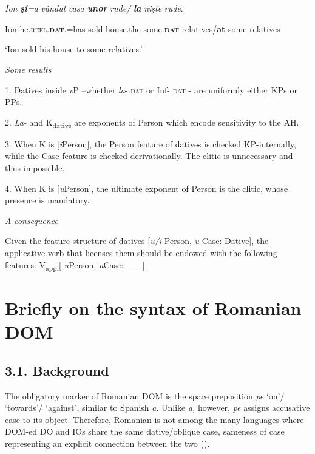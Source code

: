 \documentclass[output=paper,modfonts,nonflat]{langsci/langscibook}
\begin{document}
\ea%
    \label{ex:key:21}
    \gll\\
        \\
    \glt
    \z

          \textit{Ion}  \textbf{\textit{şi}}\textit{=a}  \textit{vândut}     \textit{casa}   \textbf{\textit{unor}}      \textit{rude/}   \textbf{\textit{la} }\textit{nişte} \textit{rude}.

  Ion   he.\textsc{refl.}\textbf{\textsc{dat}}.=has sold house.the some.\textbf{\textsc{dat} }relatives/\textbf{at} some relatives

  ‘Ion sold his house to some relatives.’

\textit{Some} \textit{results}

1. Datives inside \textit{v}P –whether \textit{la}{}- \textsc{dat} or Inf- \textsc{dat} - are uniformly either KPs or PPs.

2. \textit{La-} and K\textsubscript{dative} are exponents of Person which encode sensitivity to the AH.

3. When K is [\textit{i}Person], the Person feature of datives is checked KP-internally, while the Case feature is checked derivationally. The clitic is unnecessary and thus impossible.

4. When K is [\textit{u}Person], the ultimate exponent of Person is the clitic, whose presence is mandatory.

  \textit{A} \textit{consequence}

Given the feature structure of datives [\textit{u/i} Person, \textit{u} Case: Dative], the applicative verb that licenses them should be endowed with the following features: V\textsubscript{appl}[ \textit{u}Person, \textit{u}Case:\_\_\_].

\section{Briefly on the syntax of Romanian DOM} %

\subsection{\textbf{3.1.} \textbf{Background}}

The obligatory marker of Romanian DOM is the space preposition \textit{pe} ‘on’/ ‘towards’/ ‘against’, similar to Spanish \textit{a}. Unlike \textit{a,} however, \textit{pe} assigns accusative case to its object. Therefore, Romanian is not among the many languages where DOM-ed DO and IOs share the same dative/oblique case, sameness of case representing an explicit connection between the two (\citealt{ManziniFranco2016}).
\end{document}
